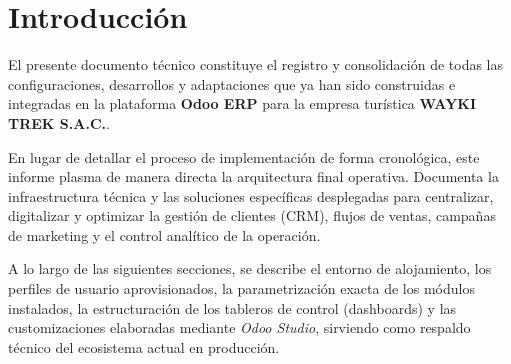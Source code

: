 \section{Introducción}

El presente documento técnico constituye el registro y consolidación de todas las configuraciones, desarrollos y adaptaciones que ya han sido construidas e integradas en la plataforma \textbf{Odoo ERP} para la empresa turística \textbf{WAYKI TREK S.A.C.}. 

En lugar de detallar el proceso de implementación de forma cronológica, este informe plasma de manera directa la arquitectura final operativa. Documenta la infraestructura técnica y las soluciones específicas desplegadas para centralizar, digitalizar y optimizar la gestión de clientes (CRM), flujos de ventas, campañas de marketing y el control analítico de la operación.

A lo largo de las siguientes secciones, se describe el entorno de alojamiento, los perfiles de usuario aprovisionados, la parametrización exacta de los módulos instalados, la estructuración de los tableros de control (dashboards) y las customizaciones elaboradas mediante \textit{Odoo Studio}, sirviendo como respaldo técnico del ecosistema actual en producción.
